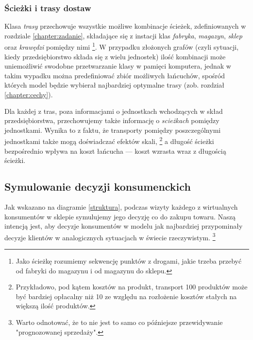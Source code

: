 \documentclass[polish, twoside, 12pt, a4paper]{article}
\theoremstyle{definition}
\theoremstyle{plain}
\theoremstyle{remark}
\begin{document}
\subsubsection{Ścieżki i trasy dostaw}

Klasa \textit{trasy} przechowuje wszystkie możliwe kombinacje ścieżek, zdefiniowanych w rozdziale \ref{chapter:zadanie}, składające się z instacji klas \textit{fabryka}, \textit{magazyn}, \textit{sklep} oraz \textit{krawędzi} pomiędzy nimi \footnote{Jako ścieżkę rozumiemy sekwencję punktów z drogami, jakie trzeba przebyć od fabryki do magazynu i od magazynu do sklepu.}. W przypadku złożonych grafów (czyli sytuacji, kiedy przedsiębiorstwo składa się z wielu jednostek) ilość kombinacji może uniemożliwić swodobne przetwarzanie klasy w pamięci komputera, jednak w takim wypadku można predefiniować zbiór możliwych łańcuchów, spośród których model będzie wybierał najbardziej optymalne trasy (zob. rozdział \ref{chapter:cechy}).

Dla każdej z tras, poza informacjami o jednostkach wchodzących w skład przedsiębiorstwa, przechowujemy także informację o \textit{scieżkach} pomiędzy jednostkami. Wynika to z faktu, że transporty pomiędzy poszczególnymi jednostkami także mogą doświadczać efektów skali, \footnote{Przykładowo, pod kątem kosztów na produkt, transport 100 produktów może być bardziej opłacalny niż 10 ze względu na rozłożenie kosztów stałych na większą ilość produktów.} a długość ścieżki bezpośrednio wpływa na koszt łańcucha --- koszt wzrasta wraz z długością ścieżki.

\subsection{Symulowanie decyzji konsumenckich} \label{chapter:customerresearch}

Jak wskazano na diagramie \ref{struktura}, podczas wizyty każdego z wirtualnych konsumentów w sklepie symulujemy jego decyzję co do zakupu towaru. Naszą intencją jest, aby decyzje konsumentów w modelu jak najbardziej przypominały decyzje klientów w analogicznych sytuacjach w świecie rzeczywistym. \footnote{Warto odnotować, że to nie jest to samo co późniejsze przewidywanie "prognozowanej sprzedaży".} 
\end{document}
